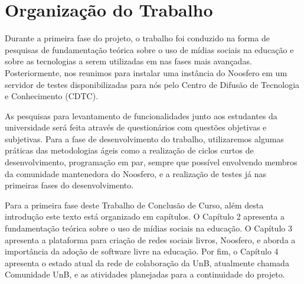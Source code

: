
\section{Organização do Trabalho}

Durante a primeira fase do projeto, o trabalho foi conduzido na forma de
pesquisas de fundamentação teórica sobre o uso de mídias sociais na educação
e sobre as tecnologias a serem utilizadas em nas fases mais avançadas.
Posteriormente, nos reunimos para instalar uma instância do Noosfero em um
servidor de testes disponibilizadas para nós pelo Centro de Difusão de
Tecnologia e Conhecimento (CDTC). 

As pesquisas para levantamento de funcionalidades junto aos estudantes
da universidade será feita através de questionários com questões objetivas
e subjetivas.
%
Para a fase de desenvolvimento do trabalho, utilizaremos algumas práticas das
metodologias ágeis como a realização de ciclos curtos de desenvolvimento,
programação em par, sempre que possível envolvendo membros da comunidade
mantenedora do Noosfero, e a realização de testes já nas primeiras fases do
desenvolvimento.

Para a primeira fase deste Trabalho de Conclusão de Curso, além desta introdução
este texto está organizado em capítulos. O Capítulo 2 apresenta a fundamentação
teórica sobre o uso de mídias sociais na educação. O Capítulo 3 apresenta
a plataforma para criação de redes sociais livros, Noosfero, e aborda a
importância da adoção de software livre na educação. Por fim, o Capítulo 4
apresenta o estado atual da rede de colaboração da UnB, atualmente chamada
Comunidade UnB, e as atividades planejadas para a continuidade do projeto.

